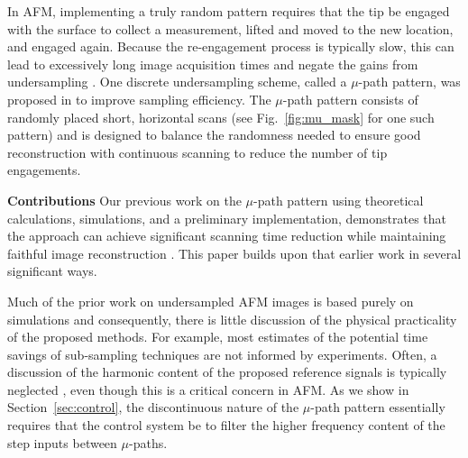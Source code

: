 \documentclass[twocolumn,oneside]{IEEEtran/IEEEtran}
\begin{document}
In AFM, implementing a truly random pattern requires that the tip be
engaged with the surface to collect a measurement, lifted and moved to
the new location, and engaged again. Because the re-engagement process
is typically slow, this can lead to excessively long image acquisition
times and negate the gains from undersampling \cite{andersson2012non}.
One discrete undersampling scheme, called a $\mu$-path pattern, was
proposed in \cite{maxwell2014compressed} to improve sampling
efficiency. The $\mu$-path pattern consists of randomly placed short,
horizontal scans (see Fig.~\ref{fig:mu_mask} for one such pattern) and
is designed to balance the randomness needed to ensure good
reconstruction with continuous scanning to reduce the number of tip
engagements.

\textbf{Contributions}
Our previous work on the $\mu$-path pattern using theoretical
calculations, simulations, and a preliminary implementation,
demonstrates that the approach can achieve significant scanning time
reduction while maintaining faithful image reconstruction
\cite{maxwell2014compressed,Luo:2015tu, braker_hardware_2018}. This
paper builds upon that earlier work in several significant ways.

Much of the prior work on undersampled AFM
images is based purely on simulations \cite{han_optimal_2018,
  Luo_nano_2015, oxvig_structure_2017, jensen_reconstruction_2013,
  maxwell_acc_2014, Chen_2012jx} and consequently, there is little discussion of the physical practicality of the proposed methods. For example, most estimates of the potential time savings of sub-sampling techniques are not informed by experiments. Often, a discussion of the harmonic content of the proposed reference signals is typically neglected \cite{luo_continuous_2019, Chen_2012jx,han_optimal_2018}, even though this is a critical concern in AFM. As we show in Section~\ref{sec:control}, the discontinuous nature of the $\mu$-path pattern essentially requires that the control system be to filter the higher frequency content of the step inputs between $\mu$-paths.
\end{document}

